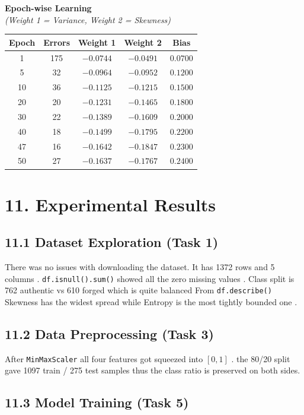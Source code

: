 \documentclass[11pt]{article}
\begin{document}
\vspace{3mm}

\textbf{Epoch-wise Learning} \\[1mm]
\textit{(Weight 1 = Variance, Weight 2 = Skewness)}

\begin{tabular}{|c|c|c|c|c|}
\hline
Epoch & Errors & Weight 1 & Weight 2 & Bias\\
\hline
1  & 175 & $-0.0744$ & $-0.0491$ & $0.0700$\\
5  & 32  & $-0.0964$ & $-0.0952$ & $0.1200$\\
10 & 36  & $-0.1125$ & $-0.1215$ & $0.1500$\\
20 & 20  & $-0.1231$ & $-0.1465$ & $0.1800$\\
30 & 22  & $-0.1389$ & $-0.1609$ & $0.2000$\\
40 & 18  & $-0.1499$ & $-0.1795$ & $0.2200$\\
47 & 16  & $-0.1642$ & $-0.1847$ & $0.2300$\\
50 & 27  & $-0.1637$ & $-0.1767$ & $0.2400$\\
\hline
\end{tabular}

\section*{11. Experimental Results}

\subsection*{11.1 Dataset Exploration (Task 1)}

There was no issues with downloading the dataset. It has 1372 rows and 5 columns . \texttt{df.isnull().sum()} showed all the zero missing values . Class split is 762 authentic vs 610 forged which is quite balanced From \texttt{df.describe()} Skewness has the widest spread while Entropy is the most tightly bounded one . 

\subsection*{11.2 Data Preprocessing (Task 3)}

After \texttt{MinMaxScaler}  all four features got squeezed into $[0,1]$ . the 80/20 split gave 1097 train / 275 test samples thus the class ratio is preserved on both sides.

\subsection*{11.3 Model Training (Task 5)}
\end{document}
